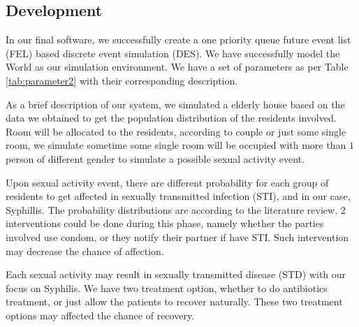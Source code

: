 \documentclass{article}
\begin{document}
\begin{normalsize}
	\subsection{Development}
	In our final software, we successfully create a one priority queue future event list (FEL) based discrete event simulation (DES).  
	We have successfully model the World as our simulation environment. We have a set of parameters as per Table \ref{tab:parameter2} with their corresponding description.
	
	As a brief description of our system, we simulated a elderly house based on the data we obtained to get the population distribution of the residents involved. Room will be allocated to the residents, according to couple or just some single room, we simulate sometime some single room will be occupied with more than $1$ person of different gender to simulate a possible sexual activity event.
	
	Upon sexual activity event, there are different probability for each group of residents to get affected in sexually transmitted infection (STI), and in our case, Syphillis. The probability distributions are according to the literature review. $2$ interventions could be done during this phase, namely whether the parties involved use condom, or they notify their partner if have STI. Such intervention may decrease the chance of affection.
	
	Each sexual activity may result in sexually transmitted disease (STD) with our focus on Syphilis. We have two treatment option, whether to do antibiotics treatment, or just allow the patients to recover naturally. These two treatment options may affected the chance of recovery.
	     

\end{normalsize}
\end{document}
